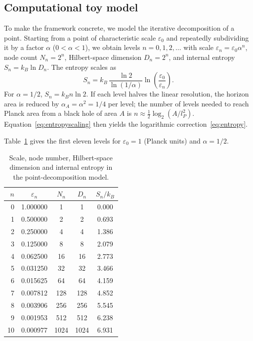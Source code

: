 \documentclass[11pt,a4paper]{article}
\theoremstyle{plain}
\begin{document}
\subsection{Computational toy model}

To make the framework concrete, we model the iterative decomposition of a point. Starting from a point of characteristic scale $\varepsilon_0$ and repeatedly subdividing it by a factor $\alpha$ ($0<\alpha<1$), we obtain levels $n=0,1,2,\dots$ with scale $\varepsilon_n=\varepsilon_0\alpha^n$, node count $N_n=2^n$, Hilbert-space dimension $D_n=2^n$, and internal entropy $S_n=k_B\ln D_n$. The entropy scales as
\begin{equation}\label{eq:entropyscaling}
S_n=k_B\,\frac{\ln 2}{\ln(1/\alpha)}\ln\!\left(\frac{\varepsilon_0}{\varepsilon_n}\right).
\end{equation}
For $\alpha=1/2$, $S_n=k_B n\ln 2$. If each level halves the linear resolution, the horizon area is reduced by $\alpha_A=\alpha^2=1/4$ per level; the number of levels needed to reach Planck area from a black hole of area $A$ is $n\approx \tfrac12\log_2(A/l_P^2)$. Equation~\eqref{eq:entropyscaling} then yields the logarithmic correction~\eqref{eq:entropy}.

Table~\ref{tab:decomposition} gives the first eleven levels for $\varepsilon_0=1$ (Planck units) and $\alpha=1/2$.

\begin{table}[htbp]
\centering
\caption{Scale, node number, Hilbert-space dimension and internal entropy in the point-decomposition model.}
\label{tab:decomposition}
\begin{tabular}{@{}rcccc@{}}
\toprule
$n$ & $\varepsilon_n$ & $N_n$ & $D_n$ & $S_n/k_B$\\
\midrule
0  & 1.000000   & 1    & 1    & 0.000\\
1  & 0.500000   & 2    & 2    & 0.693\\
2  & 0.250000   & 4    & 4    & 1.386\\
3  & 0.125000   & 8    & 8    & 2.079\\
4  & 0.062500   & 16   & 16   & 2.773\\
5  & 0.031250   & 32   & 32   & 3.466\\
6  & 0.015625   & 64   & 64   & 4.159\\
7  & 0.007812   & 128  & 128  & 4.852\\
8  & 0.003906   & 256  & 256  & 5.545\\
9  & 0.001953   & 512  & 512  & 6.238\\
10 & 0.000977   & 1024 & 1024 & 6.931\\
\bottomrule
\end{tabular}
\end{table}
\end{document}
